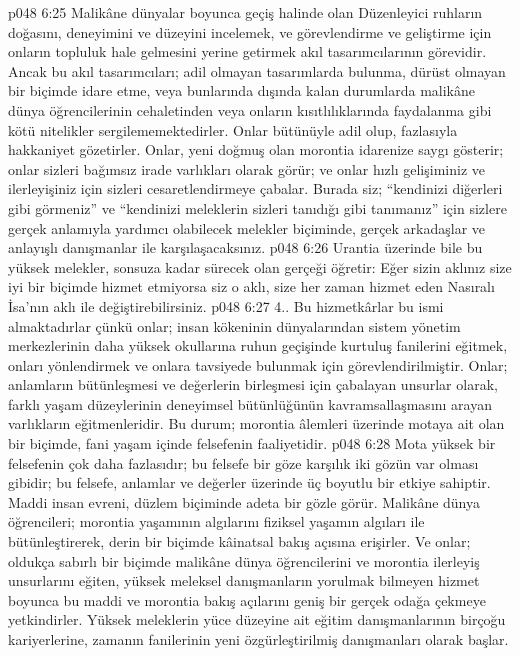 \vs p048 6:25 Malikâne dünyalar boyunca geçiş halinde olan Düzenleyici ruhların doğasını, deneyimini ve düzeyini incelemek, ve görevlendirme ve geliştirme için onların topluluk hale gelmesini yerine getirmek akıl tasarımcılarının görevidir. Ancak bu akıl tasarımcıları; adil olmayan tasarımlarda bulunma, dürüst olmayan bir biçimde idare etme, veya bunlarında dışında kalan durumlarda malikâne dünya öğrencilerinin cehaletinden veya onların kısıtlılıklarında faydalanma gibi kötü nitelikler sergilememektedirler. Onlar bütünüyle adil olup, fazlasıyla hakkaniyet gözetirler. Onlar, yeni doğmuş olan morontia idarenize saygı gösterir; onlar sizleri bağımsız irade varlıkları olarak görür; ve onlar hızlı gelişiminiz ve ilerleyişiniz için sizleri cesaretlendirmeye çabalar. Burada siz; “kendinizi diğerleri gibi görmeniz” ve “kendinizi meleklerin sizleri tanıdığı gibi tanımanız” için sizlere gerçek anlamıyla yardımcı olabilecek melekler biçiminde, gerçek arkadaşlar ve anlayışlı danışmanlar ile karşılaşacaksınız.
\vs p048 6:26 Urantia üzerinde bile bu yüksek melekler, sonsuza kadar sürecek olan gerçeği öğretir: Eğer sizin aklınız size iyi bir biçimde hizmet etmiyorsa siz o aklı, size her zaman hizmet eden Nasıralı İsa’nın aklı ile değiştirebilirsiniz.
\vs p048 6:27 4.\bibnobreakspace {}. Bu hizmetkârlar bu ismi almaktadırlar çünkü onlar; insan kökeninin dünyalarından sistem yönetim merkezlerinin daha yüksek okullarına ruhun geçişinde kurtuluş fanilerini eğitmek, onları yönlendirmek ve onlara tavsiyede bulunmak için görevlendirilmiştir. Onlar; anlamların bütünleşmesi ve değerlerin birleşmesi için çabalayan unsurlar olarak, farklı yaşam düzeylerinin deneyimsel bütünlüğünün kavramsallaşmasını arayan varlıkların eğitmenleridir. Bu durum; morontia âlemleri üzerinde motaya ait olan bir biçimde, fani yaşam içinde felsefenin faaliyetidir.
\vs p048 6:28 Mota yüksek bir felsefenin çok daha fazlasıdır; bu felsefe bir göze karşılık iki gözün var olması gibidir; bu felsefe, anlamlar ve değerler üzerinde üç boyutlu bir etkiye sahiptir. Maddi insan evreni, düzlem biçiminde adeta bir gözle görür. Malikâne dünya öğrencileri; morontia yaşamının algılarını fiziksel yaşamın algıları ile bütünleştirerek, derin bir biçimde kâinatsal bakış açısına erişirler. Ve onlar; oldukça sabırlı bir biçimde malikâne dünya öğrencilerini ve morontia ilerleyiş unsurlarını eğiten, yüksek meleksel danışmanların yorulmak bilmeyen hizmet boyunca bu maddi ve morontia bakış açılarını geniş bir gerçek odağa çekmeye yetkindirler. Yüksek meleklerin yüce düzeyine ait eğitim danışmanlarının birçoğu kariyerlerine, zamanın fanilerinin yeni özgürleştirilmiş danışmanları olarak başlar.
